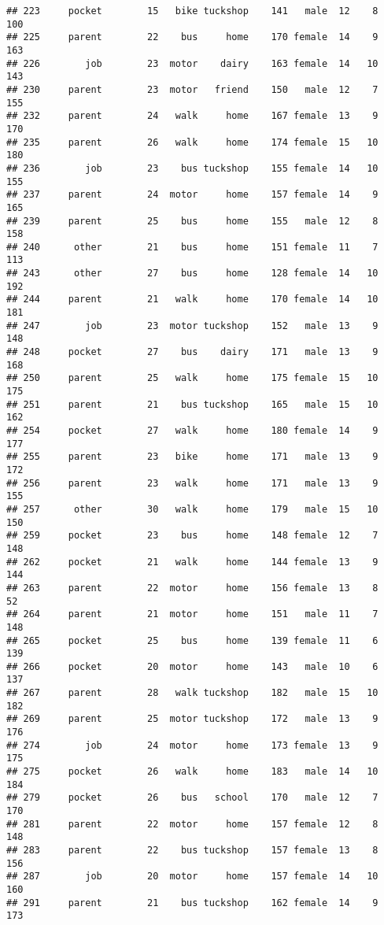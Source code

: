 \documentclass[
]{article}
\begin{document}
\begin{verbatim}
## 223     pocket        15   bike tuckshop    141   male  12    8     100
## 225     parent        22    bus     home    170 female  14    9     163
## 226        job        23  motor    dairy    163 female  14   10     143
## 230     parent        23  motor   friend    150   male  12    7     155
## 232     parent        24   walk     home    167 female  13    9     170
## 235     parent        26   walk     home    174 female  15   10     180
## 236        job        23    bus tuckshop    155 female  14   10     155
## 237     parent        24  motor     home    157 female  14    9     165
## 239     parent        25    bus     home    155   male  12    8     158
## 240      other        21    bus     home    151 female  11    7     113
## 243      other        27    bus     home    128 female  14   10     192
## 244     parent        21   walk     home    170 female  14   10     181
## 247        job        23  motor tuckshop    152   male  13    9     148
## 248     pocket        27    bus    dairy    171   male  13    9     168
## 250     parent        25   walk     home    175 female  15   10     175
## 251     parent        21    bus tuckshop    165   male  15   10     162
## 254     pocket        27   walk     home    180 female  14    9     177
## 255     parent        23   bike     home    171   male  13    9     172
## 256     parent        23   walk     home    171   male  13    9     155
## 257      other        30   walk     home    179   male  15   10     150
## 259     pocket        23    bus     home    148 female  12    7     148
## 262     pocket        21   walk     home    144 female  13    9     144
## 263     parent        22  motor     home    156 female  13    8      52
## 264     parent        21  motor     home    151   male  11    7     148
## 265     pocket        25    bus     home    139 female  11    6     139
## 266     pocket        20  motor     home    143   male  10    6     137
## 267     parent        28   walk tuckshop    182   male  15   10     182
## 269     parent        25  motor tuckshop    172   male  13    9     176
## 274        job        24  motor     home    173 female  13    9     175
## 275     pocket        26   walk     home    183   male  14   10     184
## 279     pocket        26    bus   school    170   male  12    7     170
## 281     parent        22  motor     home    157 female  12    8     148
## 283     parent        22    bus tuckshop    157 female  13    8     156
## 287        job        20  motor     home    157 female  14   10     160
## 291     parent        21    bus tuckshop    162 female  14    9     173

\end{verbatim}
\end{document}
